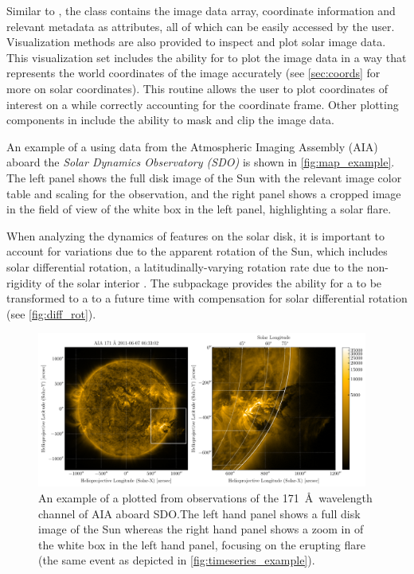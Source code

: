 Similar to \Timeseries, the \Map class contains the image data array, coordinate information and relevant metadata as attributes, all of which can be easily accessed by the user.
Visualization methods are also provided to inspect and plot solar image data.
This visualization set includes the ability for \Map to plot the image data in a way that represents the world coordinates of the image accurately (see \autoref{sec:coords} for more on solar coordinates).
This routine allows the user to plot coordinates of interest on a \Map while correctly accounting for the coordinate frame.
Other plotting components in \Map include the ability to mask and clip the image data.

An example of a \Map using data from the Atmospheric Imaging Assembly (AIA) aboard the \textit{Solar Dynamics Observatory (SDO)} is shown in \autoref{fig:map_example}.
The left panel shows the full disk image of the Sun with the relevant image color table and scaling for the observation, and the right panel shows a cropped image in the field of view of the white box in the left panel, highlighting a solar flare.

When analyzing the dynamics of features on the solar disk, it is important to account for variations due to the apparent rotation of the Sun, which includes solar differential rotation, a latitudinally-varying rotation rate due to the non-rigidity of the solar interior \citep[see][]{Beck2000}.
The  subpackage provides the ability for a \Map to be transformed to a to a future time with compensation for solar differential rotation (see \autoref{fig:diff_rot}).

\begin{figure}
    \centering
    \includegraphics[width=0.97\textwidth]{figures/map_example.pdf}
    \caption{An example of a \sunpypkg \Map plotted from observations of the 171~\AA\ wavelength channel of AIA aboard SDO.The left hand panel shows a full disk image of the Sun whereas the right hand panel shows a zoom in of the white box in the left hand panel, focusing on the erupting flare (the same event as depicted in \autoref{fig:timeseries_example}).}
    \label{fig:map_example}
\end{figure}

